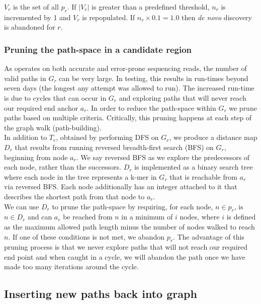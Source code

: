 $V_r$ is the set of all $p_r$. If $|V_r|$ is greater than a predefined threshold, $n_r$ is incremented by 1 and $V_r$ is repopulated. If $n_r \times 0.1 = 1.0$ then \textit{de novo} discovery is abandoned for $r$.

\subsubsection{Pruning the path-space in a candidate region}

As \pandora{} operates on both accurate and error-prone sequencing reads, the number of valid paths in $G_r$ can be very large. In testing, this results in run-times beyond seven days (the longest any attempt was allowed to run). The increased run-time is due to cycles that can occur in $G_r$ and exploring paths that will never reach our required end anchor $a_r$. In order to reduce the path-space within $G_r$ we prune paths based on multiple criteria. Critically, this pruning happens at each step of the graph walk (path-building).\\
In addition to $T_r$, obtained by performing DFS on $G_r$, we produce a distance map $D_r$ that results from running reversed breadth-first search (BFS) on $G_r$, beginning from node $a_r$. We say reversed BFS as we explore the predecessors of each node, rather than the successors. $D_r$ is implemented as a binary search tree where each node in the tree represents a k-mer in $G_r$ that is reachable from $a_r$ via reversed BFS. Each node additionally has an integer attached to it that describes the shortest path from that node to $a_r$.\\
We can use $D_r$ to prune the path-space by requiring, for each node, $n \in p_r$, is $n \in D_r$ and can $a_r$ be reached from $n$ in a minimum of $i$ nodes, where $i$ is defined as the maximum allowed path length minus the number of nodes walked to reach $n$. If one of these conditions is not met, we abandon $p_r$. The advantage of this pruning process is that we never explore paths that will not reach our required end point and when caught in a cycle, we will abandon the path once we have made too many iterations around the cycle.

\subsection{Inserting new paths back into graph}

